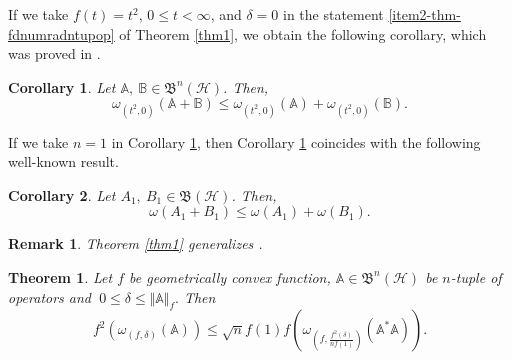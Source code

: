 \documentclass[12pt]{article}
\newtheorem{theorem}{Theorem}
\newtheorem{corollary}{Corollary}
\newtheorem{remark}{Remark}
\begin{document}
If we take $f(t)=t^{2}$, $0 \leq t < \infty $, and $\delta = 0$ in the statement \ref{item2-thm-fdnumradntupop} of Theorem \ref{thm1}, we obtain the following corollary, which was proved in \cite{Jana2024}.

\begin{corollary}
\label{cor1}
Let $\mathbb{A}, \ \mathbb{B} \in \mathfrak{B}^{n}(\mathcal{H})$. Then,
\[
\omega_{(t^{2},0)}(\mathbb{A}+\mathbb{B})
\leq
\omega_{(t^{2},0)}(\mathbb{A})
+
\omega_{(t^{2},0)}(\mathbb{B}).
\]
\end{corollary}

If we take $n=1$ in Corollary \ref{cor1}, then Corollary \ref{cor1} coincides with the following well-known result.
\begin{corollary}
\label{cor2}
Let $A_{1}, \ B_{1} \in \mathfrak{B}(\mathcal{H})$. Then,
\[
\omega(A_{1}+B_{1})
\leq
\omega(A_{1})
+
\omega(B_{1}).
\]
\end{corollary}
\begin{remark}
Theorem \ref{thm1} generalizes \textnormal{\cite[Proposition 2.2]{Ismailov2026}}.
\end{remark}

\begin{theorem}
\label{thm2}
Let $ f $ be geometrically convex function,  $
\mathbb{A}\in \mathfrak{B}^{n}(\mathcal{H}) $ be $n$-tuple of operators and $ \ 0\leq \delta \leq \Vert \mathbb{A} \Vert_{f}.
$ Then
\[
f^{2}\left( \omega_{(f,\delta)}(\mathbb{A} )\right)
\leq
\sqrt{n}f(1) f\left(
\omega_{\left( f, \frac{f^{2}(\delta )}{nf(1)} \right) }(\mathbb{A}^{*}\mathbb{A}) \right) .
\]
\end{theorem}
\end{document}

